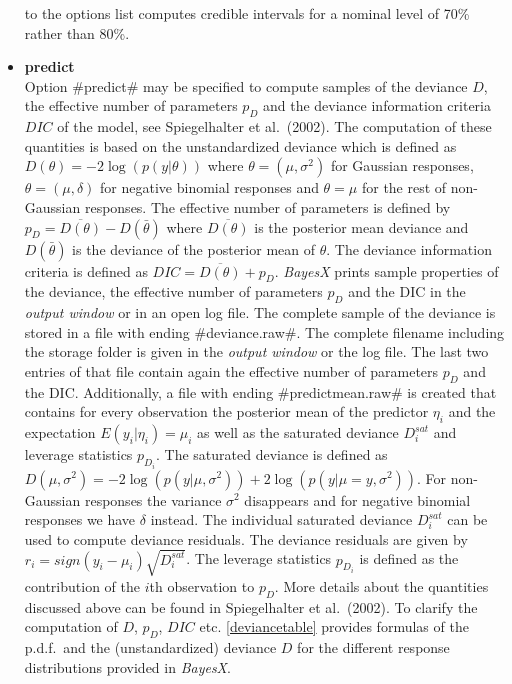 \begin{itemize}
to the options list computes credible intervals for a nominal
level of 70\% rather than 80\%.
\item \label{predict} {\bf predict} \\
  
   
Option #predict# may be specified to compute samples of the
deviance $D$, the effective number of parameters $p_D$ and the
deviance information criteria $DIC$ of the model, see
Spiegelhalter et al.~(2002). The computation of these quantities
is based on the unstandardized deviance which is defined as
$D(\theta) = -2\log(p(y|\theta))$ where $\theta = (\mu,\sigma^2)$
for Gaussian responses, $\theta = (\mu,\delta)$ for negative
binomial responses  and $\theta = \mu$ for the rest of non-Gaussian
responses. The effective number of parameters is defined by $p_D =
\overline{D(\theta)} - D(\bar{\theta})$ where
$\overline{D(\theta)}$ is the posterior mean deviance and
$D(\bar{\theta})$ is the deviance of the posterior mean of
$\theta$. The deviance information criteria is defined as $DIC =
\overline{D(\theta)} + p_D$. {\em BayesX} prints sample properties
of the deviance, the effective number of parameters $p_D$ and the
DIC in the {\em output window} or in an open log file. The
complete sample of the deviance is stored in a file with ending
#deviance.raw#. The complete filename including the storage
folder is given in the {\em output window} or the log file. The
last two entries of that file contain again the effective number
of parameters $p_D$ and the DIC. Additionally, a file with ending
#predictmean.raw# is created that contains for every observation
the posterior mean of the predictor $\eta_i$ and the expectation
$E(y_i | \eta_i) = \mu_i$ as well as the saturated deviance
$D^{sat}_i$ and leverage statistics $p_{D_i}$. The saturated
deviance is defined as $D(\mu,\sigma^2) =
-2\log(p(y|\mu,\sigma^2))+2\log(p(y|\mu=y,\sigma^2))$. For
non-Gaussian responses the variance $\sigma^2$ disappears and for
negative binomial responses we have $\delta$ instead. The
individual saturated deviance $D^{sat}_i$ can be used to compute
deviance residuals. The deviance residuals are given by $r_i =
sign(y_i-\mu_i) \sqrt{D^{sat}_i}$. The leverage statistics
$p_{D_i}$ is defined as the contribution of the $i$th observation
to $p_D$. More details about the quantities discussed above can be
found in Spiegelhalter et al.~(2002). To clarify the computation
of $D$, $p_D$, $DIC$ etc. \autoref{deviancetable} provides
formulas of the p.d.f.~and the (unstandardized) deviance $D$ for
the different response distributions provided in {\em BayesX}.
\end{itemize}


